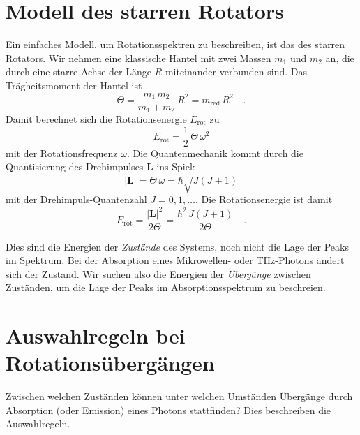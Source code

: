 \section{Modell des starren Rotators}

Ein einfaches Modell, um Rotationsspektren zu beschreiben, ist das des starren Rotators. Wir nehmen eine klassische Hantel mit zwei Massen $m_1$ und $m_2$ an, die durch eine starre Achse der Länge $R$ miteinander verbunden sind. Das Trägheitsmoment der Hantel ist
\begin{equation}
 \Theta = \frac{m_1 \, m_2}{m_1 + m_2} \, R^2 = m_\text{red} \, R^2 \quad .
\end{equation}
Damit berechnet sich die Rotationsenergie $E_\text{rot}$ zu
\begin{equation}
 E_\text{rot} = \frac{1}{2} \, \Theta \, \omega^2
\end{equation}
mit der Rotationsfrequenz $\omega$. Die Quantenmechanik kommt durch die Quantisierung des Drehimpulses $\mathbf{L} $ ins Spiel:
\begin{equation}
 | \mathbf{L} | = \Theta \, \omega = \hbar \sqrt{J (J + 1)}
\end{equation}
mit der Drehimpuls-Quantenzahl $J = 0, 1, \dots$. Die Rotationsenergie ist damit
\begin{equation}
 E_\text{rot} = \frac{ | \mathbf{L} |^2}{2 \Theta} = \frac{\hbar^2 \, J (J+1)}{2 \Theta} \quad .
\end{equation}

Dies sind die Energien der \emph{Zustände} des Systems, noch nicht die Lage der Peaks im Spektrum. Bei der Absorption eines Mikrowellen- oder THz-Photons ändert sich der Zustand. Wir suchen also die Energien der \emph{Übergänge} zwischen Zuständen, um die Lage der Peaks im Absorptionsspektrum zu beschreien.




\section{Auswahlregeln bei Rotationsübergängen}

Zwischen welchen Zuständen können unter welchen Umständen Übergänge durch Absorption (oder Emission) eines Photons stattfinden? Dies beschreiben  die Auswahlregeln.

